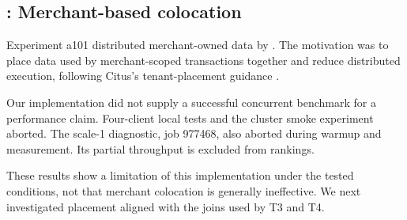 \subsection{: Merchant-based colocation}
Experiment a101 distributed merchant-owned data by .
The motivation was to place data used by merchant-scoped transactions together
and reduce distributed execution, following Citus's tenant-placement guidance
\citep{citus-distribution}.

Our implementation did not supply a successful concurrent benchmark for a
performance claim. Four-client local tests and the cluster smoke experiment
aborted. The scale-1 diagnostic, job 977468, also aborted during warmup and
measurement. Its partial throughput is excluded from rankings.

These results show a limitation of this implementation under the tested
conditions, not that merchant colocation is generally ineffective. We next
investigated placement aligned with the joins used by T3 and T4.
